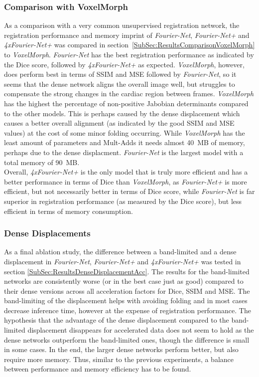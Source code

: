 \subsubsection{Comparison with VoxelMorph} \label{SubSubSec:DiscussionComparisonVoxelMorph}
As a comparison with a very common unsupervised registration network, the registration performance and memory imprint of \emph{Fourier-Net}, \emph{Fourier-Net+} and \emph{4xFourier-Net+} was compared in section~\ref{SubSec:ResultsComparisonVoxelMorph} to \emph{VoxelMorph}. \emph{Fourier-Net} has the best registration performance as indicated by the Dice score, followed by \emph{4xFourier-Net+} as expected. \emph{VoxelMorph}, however, does perform best in terms of SSIM and MSE followed by \emph{Fourier-Net}, so it seems that the dense network aligns the overall image well, but struggles to compensate the strong changes in the cardiac region between frames. \emph{VoxelMorph} has the highest the percentage of non-positive Jabobian determinants compared to the other models. This is perhaps caused by the dense displacement which causes a better overall alignment (as indicated by the good SSIM and MSE values) at the cost of some minor folding occurring. While \emph{VoxelMorph} has the least amount of parameters and Mult-Adds it needs almost 40~MB of memory, perhaps due to the dense displacment. \emph{Fourier-Net} is the largest model with a total memory of 90~MB. \\
Overall, \emph{4xFourier-Net+} is the only model that is truly more efficient and has a better performance in terms of Dice than \emph{VoxelMorph}, as \emph{Fourier-Net+} is more efficient, but not necessarily better in terms of Dice score, while \emph{Fourier-Net} is far superior in registration performance (as measured by the Dice score), but less efficient in terms of memory consumption.

\subsubsection{Dense Displacements} \label{SubSubSec:DiscussionDenseDisplacements}
As a final ablation study, the difference between a band-limited and a dense displacement in \emph{Fourier-Net}, \emph{Fourier-Net+} and \emph{4xFourier-Net+} was tested in section \ref{SubSec:ResultsDenseDisplacementAcc}. The results for the band-limited networks are consistently worse (or in the best case just as good) compared to their dense versions across all acceleration factors for Dice, SSIM and MSE. The band-limiting of the displacement helps with avoiding folding and in most cases decrease inference time, however at the expense of registration performance. The hypothesis that the advantage of the dense displacement compared to the band-limited displacement disappears for accelerated data does not seem to hold as the dense networks outperform the band-limited ones, though the difference is small in some cases. In the end, the larger dense networks perform better, but also require more memory. Thus, similar to the previous experiments, a balance between performance and memory efficiency has to be found.

